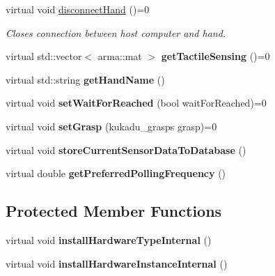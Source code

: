 \begin{DoxyCompactItemize}
\item 
virtual void \hyperlink{classkukadu_1_1GenericHand_a94c4a983aae8562bda7711a71baa7502}{disconnect\+Hand} ()=0
\begin{DoxyCompactList}\small\item\em Closes connection between host computer and hand. \end{DoxyCompactList}\item 
virtual std\+::vector$<$ arma\+::mat $>$ {\bfseries get\+Tactile\+Sensing} ()=0\hypertarget{classkukadu_1_1GenericHand_a85b4263bc45c19fb64fd167d58ca7e43}{}\label{classkukadu_1_1GenericHand_a85b4263bc45c19fb64fd167d58ca7e43}

\item 
virtual std\+::string {\bfseries get\+Hand\+Name} ()\hypertarget{classkukadu_1_1GenericHand_adcb32c8131d597cd67671c44265b56df}{}\label{classkukadu_1_1GenericHand_adcb32c8131d597cd67671c44265b56df}

\item 
virtual void {\bfseries set\+Wait\+For\+Reached} (bool wait\+For\+Reached)=0\hypertarget{classkukadu_1_1GenericHand_ad2a3163741664b6777e148343d22879a}{}\label{classkukadu_1_1GenericHand_ad2a3163741664b6777e148343d22879a}

\item 
virtual void {\bfseries set\+Grasp} (kukadu\+\_\+grasps grasp)=0\hypertarget{classkukadu_1_1GenericHand_ad64a2319fec86b037f7383d2657ed601}{}\label{classkukadu_1_1GenericHand_ad64a2319fec86b037f7383d2657ed601}

\item 
virtual void {\bfseries store\+Current\+Sensor\+Data\+To\+Database} ()\hypertarget{classkukadu_1_1GenericHand_ab1d138bbbf8575eb6e981c5f5fd91376}{}\label{classkukadu_1_1GenericHand_ab1d138bbbf8575eb6e981c5f5fd91376}

\item 
virtual double {\bfseries get\+Preferred\+Polling\+Frequency} ()\hypertarget{classkukadu_1_1GenericHand_ada5ce87f83585abeb39709e50388e60f}{}\label{classkukadu_1_1GenericHand_ada5ce87f83585abeb39709e50388e60f}

\end{DoxyCompactItemize}
\subsection*{Protected Member Functions}
\begin{DoxyCompactItemize}
\item 
virtual void {\bfseries install\+Hardware\+Type\+Internal} ()\hypertarget{classkukadu_1_1GenericHand_ac784c881aaa1f6db378bff64407384a4}{}\label{classkukadu_1_1GenericHand_ac784c881aaa1f6db378bff64407384a4}

\item 
virtual void {\bfseries install\+Hardware\+Instance\+Internal} ()\hypertarget{classkukadu_1_1GenericHand_ac13a2cd5234361b3483f0cc88467cbd7}{}\label{classkukadu_1_1GenericHand_ac13a2cd5234361b3483f0cc88467cbd7}

\end{DoxyCompactItemize}
